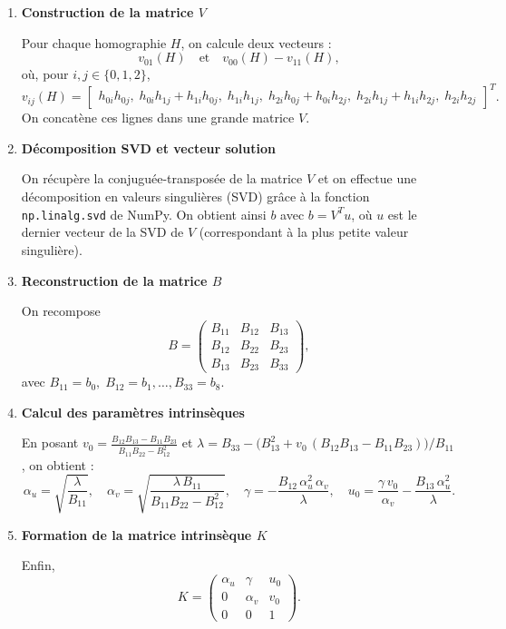 \documentclass[12pt]{article}
\begin{document}
\begin{enumerate}
    \item \textbf{Construction de la matrice \(V\)}

    Pour chaque homographie \(H\), on calcule deux vecteurs :
    \[
        v_{01}(H) \quad\text{et}\quad v_{00}(H) - v_{11}(H),
    \]
    où, pour \(i,j\in\{0,1,2\}\),
    \[
        v_{ij}(H) =
        \begin{bmatrix}
        h_{0i}h_{0j},\;
        h_{0i}h_{1j}+h_{1i}h_{0j},\;
        h_{1i}h_{1j},\;
        h_{2i}h_{0j}+h_{0i}h_{2j},\;
        h_{2i}h_{1j}+h_{1i}h_{2j},\;
        h_{2i}h_{2j}
        \end{bmatrix}^T.
    \]
    On concatène ces lignes dans une grande matrice $V$.
    \linebreak

    \item \textbf{Décomposition SVD et vecteur solution}  
    
    On récupère la conjuguée-transposée de la matrice \(V\) et on effectue une décomposition en valeurs singulières (SVD) grâce à la fonction \texttt{np.linalg.svd} de NumPy.
    On obtient ainsi \(b\) avec \(b = V^T u\), où \(u\) est le dernier vecteur de la SVD de \(V\) (correspondant à la plus petite valeur singulière).
    \linebreak

    \item \textbf{Reconstruction de la matrice \(B\)}  
    
    On recompose
    \[
        B = 
        \begin{pmatrix}
        B_{11} & B_{12} & B_{13} \\
        B_{12} & B_{22} & B_{23} \\
        B_{13} & B_{23} & B_{33}
        \end{pmatrix},
    \]
    avec \(B_{11}=b_0,\;B_{12}=b_1,\ldots,B_{33}=b_8\).
    \linebreak

    \item \textbf{Calcul des paramètres intrinsèques}  
    
    En posant \(v_0=\frac{B_{12}B_{13}-B_{11}B_{23}}{B_{11}B_{22}-B_{12}^2}\) et
    \(\lambda = B_{33} - \bigl(B_{13}^2 + v_0\,(B_{12}B_{13}-B_{11}B_{23})\bigr)/B_{11}\),
    on obtient :
    \[
        \alpha_u = \sqrt{\frac{\lambda}{B_{11}}},\quad
        \alpha_v = \sqrt{\frac{\lambda\,B_{11}}{B_{11}B_{22}-B_{12}^2}},\quad
        \gamma = -\frac{B_{12}\,\alpha_u^2\,\alpha_v}{\lambda},\quad
        u_0 = \frac{\gamma\,v_0}{\alpha_v}-\frac{B_{13}\,\alpha_u^2}{\lambda}.
    \]
    \linebreak

    \item \textbf{Formation de la matrice intrinsèque \(K\)}  
    
    Enfin,
    \[
        K = 
        \begin{pmatrix}
        \alpha_u & \gamma   & u_0 \\
        0        & \alpha_v & v_0 \\
        0        & 0        & 1
        \end{pmatrix}.
    \]
\end{enumerate}
\end{document}
